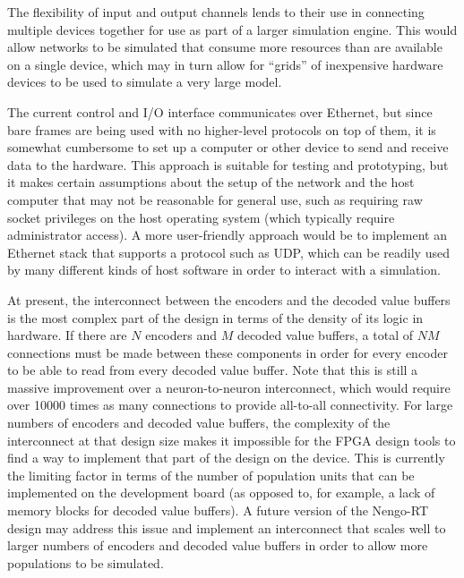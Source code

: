 \documentclass[english]{article}
\newcommand{\design}{Nengo-RT}
\begin{document}
The flexibility of input and output channels lends to their use in connecting multiple devices together for use as part of a larger simulation engine.
This would allow networks to be simulated that consume more resources than are available on a single device, which may in turn allow
for ``grids'' of inexpensive hardware devices to be used to simulate a very large model.

The current control and I/O interface communicates over Ethernet, but since bare frames are being used with no higher-level protocols on top of them,
it is somewhat cumbersome to set up a computer or other device to send and receive data to the hardware.
This approach is suitable for testing and prototyping, but it makes certain assumptions about the setup of the network and the host computer that
may not be reasonable for general use, such as requiring raw socket privileges on the host operating system (which typically require administrator access).
A more user-friendly approach would be to implement an Ethernet stack that supports a protocol such as UDP, which can be readily used by many different
kinds of host software in order to interact with a simulation.

At present, the interconnect between the encoders and the decoded value
buffers is the most complex part of the design in terms of the density of its logic
in hardware. If there are $N$ encoders and $M$ decoded value buffers, a total of
$NM$ connections must be made between these components in order for every
encoder to be able to read from every decoded value buffer.
Note that this is still a massive improvement over a neuron-to-neuron interconnect,
which would require over 10000 times as many connections to provide all-to-all connectivity.
For large numbers
of encoders and decoded value buffers, the complexity of the interconnect at
that design size makes it impossible for the FPGA design tools to find a way to
implement that part of the design on the device. This is currently the limiting
factor in terms of the number of population units that can be implemented on
the development board (as opposed to, for example, a lack of memory blocks for
decoded value buffers). A future version of the \design{} design may address
this issue and implement an interconnect that scales well to larger numbers of
encoders and decoded value buffers in order to allow more populations to be
simulated. %
\end{document}
